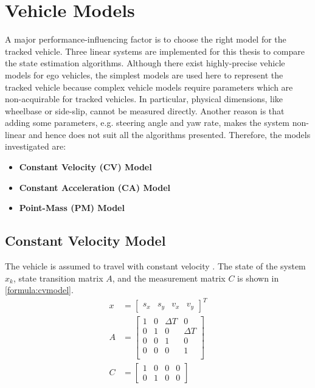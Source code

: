 \section{Vehicle Models}
A major performance-influencing factor is to choose the right model for the tracked vehicle. Three linear systems are implemented for this thesis to compare the state estimation algorithms. Although there exist highly-precise vehicle models for ego vehicles, the simplest models are used here to represent the tracked vehicle because complex vehicle models require parameters which are non-acquirable for tracked vehicles. In particular, physical dimensions, like wheelbase or side-slip, cannot be measured directly. Another reason is that adding some parameters, e.g. steering angle and yaw rate, makes the system non-linear and hence does not suit all the algorithms presented. Therefore, the models investigated are:
\begin{itemize}
\item \textbf{Constant Velocity (CV) Model}
\item \textbf{Constant Acceleration (CA) Model}
\item \textbf{Point-Mass (PM) Model}
\end{itemize}

\subsection{Constant Velocity Model}
The vehicle is assumed to travel with constant velocity \cite{Schubert2008}. The state of the system $x_k$, state transition matrix $A$, and the measurement matrix $C$ is shown in \eqref{formula:cvmodel}.
\begin{equation}
\label{formula:cvmodel}
\begin{split}
x &=
\left[\begin{matrix}
s_x & s_y & v_x & v_y
\end{matrix}\right]^{T}\\
A&= \left[\begin{matrix}
1 & 0 & \Delta T & 0\\
0 & 1 & 0 & \Delta T\\
0 & 0 & 1 & 0\\
0 & 0 & 0 & 1\\
\end{matrix}\right]\\
C&= \left[\begin{matrix}
1 & 0 & 0 & 0\\
0 & 1 & 0 & 0
\end{matrix}\right]
\end{split}
\end{equation}


